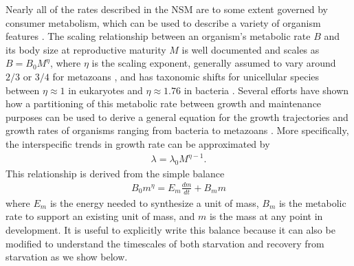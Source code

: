 \documentclass{pnastwo}
\begin{document}
\begin{article}
Nearly all of the rates described in the NSM are to some extent governed by consumer metabolism, which can be used to describe a variety of organism features \cite{}. The scaling relationship between an organism's metabolic rate $B$ and its body size at reproductive maturity $M$ is well documented \cite{West:2002it} and scales as $B = B_0 M^\eta$, where $\eta$ is the scaling exponent, generally assumed to vary around $2/3$ or $3/4$ for metazoans \cite{}, and has taxonomic shifts for unicellular species between $\eta\approx 1$ in eukaryotes and $\eta\approx 1.76$ in bacteria \cite{DeLong:2010dy,Kempes:2012hy}. Several efforts have shown how a partitioning of this metabolic rate between growth and maintenance purposes can be used to derive a general equation for the growth trajectories and growth rates of organisms ranging from bacteria to metazoans \cite{Kempes:2012hy,more}. More specifically, the interspecific trends in growth rate can be approximated by 
\begin{eqnarray}
\lambda = \lambda_0 M^{\eta-1}.
\label{lambda}
\end{eqnarray}
This relationship is derived from the simple balance
\begin{eqnarray}
\label{balance}
B_{0}m^{\eta}=E_{m}\frac{dm}{dt}+B_{m}m
\end{eqnarray}
where $E_{m}$ is the energy needed to synthesize a unit of mass, $B_{m}$ is the metabolic rate to support an existing unit of mass, and $m$ is the mass at any point in development. It is useful to explicitly write this balance because it can also be modified to understand the timescales of both starvation and recovery from starvation as we show below.


\end{article}
\end{document}
